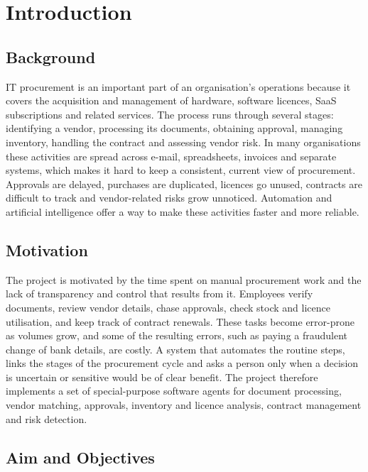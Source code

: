 
\chapter[Introduction]{\centering Introduction}\label{chap1}
\newpage

\section{Background}
IT procurement is an important part of an organisation's operations because it covers the acquisition and management of hardware, software licences, SaaS subscriptions and related services. The process runs through several stages: identifying a vendor, processing its documents, obtaining approval, managing inventory, handling the contract and assessing vendor risk. In many organisations these activities are spread across e-mail, spreadsheets, invoices and separate systems, which makes it hard to keep a consistent, current view of procurement. Approvals are delayed, purchases are duplicated, licences go unused, contracts are difficult to track and vendor-related risks grow unnoticed. Automation and artificial intelligence offer a way to make these activities faster and more reliable.

\section{Motivation}
The project is motivated by the time spent on manual procurement work and the lack of transparency and control that results from it. Employees verify documents, review vendor details, chase approvals, check stock and licence utilisation, and keep track of contract renewals. These tasks become error-prone as volumes grow, and some of the resulting errors, such as paying a fraudulent change of bank details, are costly. A system that automates the routine steps, links the stages of the procurement cycle and asks a person only when a decision is uncertain or sensitive would be of clear benefit. The project therefore implements a set of special-purpose software agents for document processing, vendor matching, approvals, inventory and licence analysis, contract management and risk detection.

\section{Aim and Objectives}

